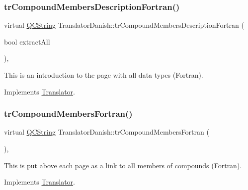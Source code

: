 \subsubsection{\texorpdfstring{trCompoundMembersDescriptionFortran()}{trCompoundMembersDescriptionFortran()}}
{\footnotesize\ttfamily virtual \mbox{\hyperlink{class_q_c_string}{Q\+C\+String}} Translator\+Danish\+::tr\+Compound\+Members\+Description\+Fortran (\begin{DoxyParamCaption}\item[{bool}]{extract\+All }\end{DoxyParamCaption})\hspace{0.3cm}{\ttfamily [inline]}, {\ttfamily [virtual]}}

This is an introduction to the page with all data types (Fortran). 

Implements \mbox{\hyperlink{class_translator}{Translator}}.

\mbox{\label{class_translator_danish_add31f1de5778df55b717465844a6dea1}} 
\subsubsection{\texorpdfstring{trCompoundMembersFortran()}{trCompoundMembersFortran()}}
{\footnotesize\ttfamily virtual \mbox{\hyperlink{class_q_c_string}{Q\+C\+String}} Translator\+Danish\+::tr\+Compound\+Members\+Fortran (\begin{DoxyParamCaption}{ }\end{DoxyParamCaption})\hspace{0.3cm}{\ttfamily [inline]}, {\ttfamily [virtual]}}

This is put above each page as a link to all members of compounds (Fortran). 

Implements \mbox{\hyperlink{class_translator}{Translator}}.

\mbox{\label{class_translator_danish_a4f9d6e42df25eb16d511bc22410369d9}} 
